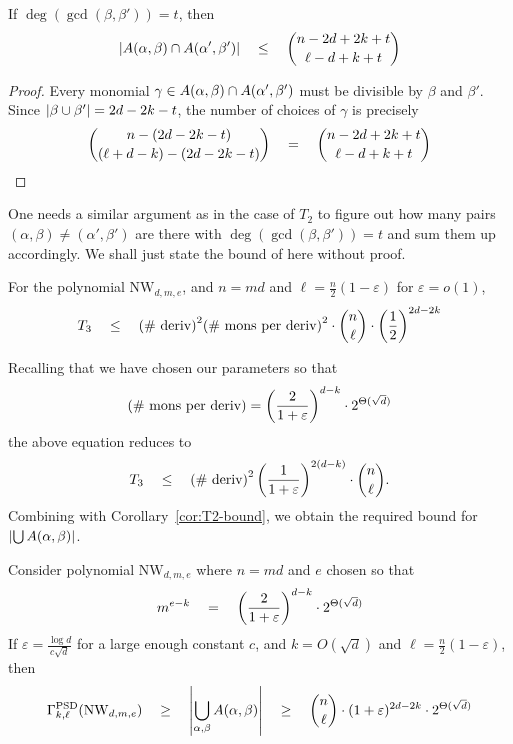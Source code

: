 \documentclass[12pt]{report}
\newcommand{\NW}{\mathrm{NW}}
\renewcommand{\epsilon}{\varepsilon}
\begin{document}
\begin{observation}\label{obs:T3-proxy}
If $\deg(\gcd(\beta, \beta')) = t$, then
\[
\left|A(\alpha, \beta) \cap A(\alpha', \beta')\right| \quad \leq \quad \binom{n - 2d + 2k + t}{\ell - d + k +t}
\]
\end{observation}
\begin{proof}
Every monomial $\gamma \in A(\alpha, \beta) \cap A(\alpha', \beta')$ must be divisible by $\beta$ and $\beta'$. Since $\left|\beta \cup \beta'\right| = 2d - 2k - t$, the number of choices of $\gamma$ is precisely
\[
\binom{n - (2d - 2k -t)}{(\ell + d - k) - (2d - 2k - t)} \quad = \quad \binom{n - 2d + 2k + t}{\ell - d + k + t}\qedhere
\]
\end{proof}

One needs a similar argument as in the case of $T_2$ to figure out how many pairs $(\alpha, \beta) \neq (\alpha',\beta')$ are there with $\deg(\gcd(\beta, \beta')) = t$ and sum them up accordingly. We shall just state the bound of \cite{KS14} here without proof. 

\begin{lemma}[\cite{KS14}] \label{lem:T3-bound}
For the polynomial $\NW_{d,m,e}$, and $n = md$ and $\ell = \frac{n}{2}(1 - \epsilon)$ for $\epsilon = o(1)$, 
\[
T_3 \quad \leq \quad \text{(\# deriv)}^2 \text{(\# mons per deriv)}^2 \cdot \binom{n}{\ell}\cdot \left(\frac{1}{2}\right)^{2d - 2k}
\]
\end{lemma}

Recalling that we have chosen our parameters so that 
\[
\text{(\# mons per deriv)} = \inparen{\frac{2}{1+\epsilon}}^{d-k} \cdot 2^{\Theta(\sqrt{d})}
\]
the above equation reduces to 
\[
T_3 \quad \leq \quad \text{(\# deriv)}^2 \inparen{\frac{1}{1+\epsilon}}^{2(d-k)} \cdot \binom{n}{\ell}.
\]
Combining with Corollary~\ref{cor:T2-bound}, we obtain the required bound for $\left|\bigcup A(\alpha, \beta)\right|$. 

\begin{lemma}
Consider polynomial $\NW_{d,m,e}$ where $n = md$ and $e$ chosen so that
\[m^{e-k} \spaced{=}  \inparen{\frac{2}{1+\epsilon}}^{d-k} \cdot 2^{\Theta(\sqrt{d})}\]
If $\epsilon = \frac{\log d}{c\sqrt{d}}$ for a large enough constant $c$, and $k = O(\sqrt{d})$ and $\ell = \frac{n}{2}(1 - \epsilon)$, then
\[
\Gamma^{\mathrm{PSD}}_{k,\ell}(\NW_{d,m,e})\spaced{\geq}\abs{\Union_{\alpha, \beta} A(\alpha, \beta)} \spaced{\geq} \binom{n}{\ell} \cdot (1+\epsilon)^{2d-2k} \cdot 2^{\Theta(\sqrt{d})}
\] 
\end{lemma}
\end{document}
